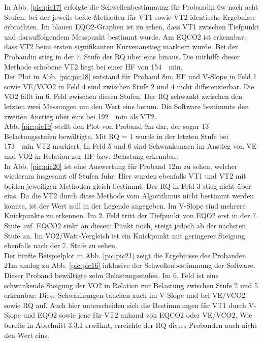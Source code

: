%
In Abb. \ref{pic:pic17} erfolgte die Schwellenbestimmung für Probandin 6w nach acht Stufen, bei der jeweils beide Methoden für VT1 sowie  VT2 identische Ergebnisse erbrachten. Im blauen \acs{EQO2}-Graphen ist zu sehen, dass VT1 zwischen Tiefpunkt und darauffolgendem Messpunkt bestimmt wurde. Am \acs{EQCO2} ist erkennbar, dass VT2 beim ersten signifikanten Kurvenanstieg markiert wurde. Bei der Probandin stieg in der 7. Stufe der RQ über eins hinaus. Die mithilfe dieser Methode erhobene VT2 liegt bei einer \acs{HF} von \SI{154}{\per\minute}.\\
Der Plot in Abb. \ref{pic:pic18} entstand für Proband 8m. \acs{HF} und V-Slope in Feld 1 sowie \acs{VE}/\acs{VCO2} in Feld 4 sind zwischen Stufe 2 und 4 nicht differenzierbar. Die \acs{VO2} fällt im 6. Feld zwischen diesen Stufen. Der RQ schwankt zwischen den letzten zwei Messungen um den Wert eins herum. Die Software bestimmte den zweiten Anstieg über eins bei \SI{192}{\per\minute} als VT2.\\
Abb. \ref{pic:pic19} stellt den Plot von Proband 9m dar, der sogar 13 Belastungsstufen bewältigte. Mit RQ = 1 wurde in der letzten Stufe bei \SI{173}{\per\minute} VT2 markiert. In Feld 5 und 6 sind Schwankungen im Anstieg von \acs{VE} und \acs{VO2} in Relation zur \acs{HF} bzw. Belastung erkennbar.\\ 
In Abb. \ref{pic:pic20} ist eine Auswertung für Proband 12m zu sehen, welcher wiederum insgesamt elf Stufen fuhr. Hier wurden ebenfalls VT1 und VT2 mit beiden jeweiligen Methoden gleich bestimmt. Der RQ in Feld 3 stieg nicht über eins. Da die VT2 durch diese Methode vom Algorithmus nicht bestimmt werden konnte, ist der Wert null in der Legende angegeben. Im V-Slope sind mehrere Knickpunkte zu erkennen. Im 2. Feld tritt der Tiefpunkt von \acs{EQO2} erst in der 7. Stufe auf. \acs{EQCO2} sinkt an diesem Punkt noch, steigt jedoch ab der nächsten Stufe an. Im \acs{VO2}/Watt-Vergleich ist ein Knickpunkt mit geringerer Steigung ebenfalls nach der 7. Stufe zu sehen.\\
Der fünfte Beispielplot in Abb. \ref{pic:pic21} zeigt die Ergebnisse des Probanden 21m analog zu Abb. \ref{pic:pic16} inklusive der Schwellenbestimmung der Software. Dieser Proband bewältigte zehn Belastungsstufen. Im 6. Feld ist eine schwankende Steigung der \acs{VO2} in Relation zur Belastung zwischen Stufe 2 und 5 erkennbar. Diese Schwankungen tauchen auch im V-Slope und bei \acs{VE}/\acs{VCO2} sowie RQ auf. Auch hier unterscheiden sich die Bestimmungen für VT1 durch V-Slope und \acs{EQO2} sowie jene für VT2 anhand von \acs{EQCO2} oder \acs{VE}/\acs{VCO2}. Wie bereits in Abschnitt 3.3.1 erwähnt, erreichte der RQ dieses Probanden auch nicht den Wert eins.

